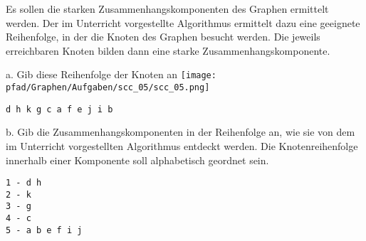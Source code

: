 \question[5]
Es sollen die starken Zusammenhangskomponenten des Graphen ermittelt werden.
Der im Unterricht vorgestellte Algorithmus ermittelt dazu eine
geeignete Reihenfolge, in der die Knoten des Graphen besucht werden. Die
jeweils erreichbaren Knoten bilden dann eine starke Zusammenhangskomponente.

a. Gib diese Reihenfolge der Knoten an
\texttt{[image: \\pfad/Graphen/Aufgaben/scc\_05/scc\_05.png]}
\begin{solutionbox}{2cm}
\begin{lstlisting}
d h k g c a f e j i b
\end{lstlisting}
\end{solutionbox}

b. Gib die Zusammenhangskomponenten in der Reihenfolge an, wie sie von
dem im Unterricht vorgestellten Algorithmus entdeckt werden.
Die Knotenreihenfolge innerhalb einer Komponente soll
alphabetisch geordnet sein.
\begin{solutionbox}{4cm}
\begin{lstlisting}
1 - d h
2 - k
3 - g
4 - c
5 - a b e f i j
\end{lstlisting}
\end{solutionbox}
